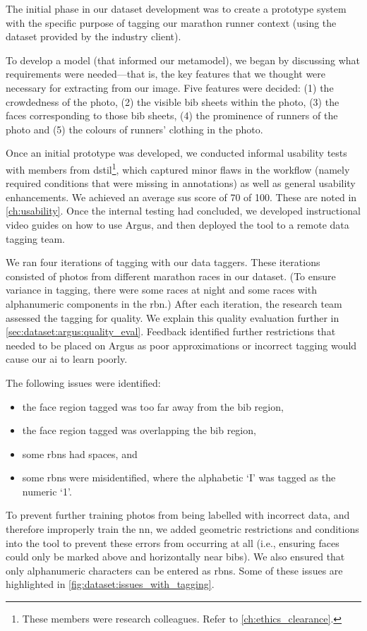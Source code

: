 The initial phase in our dataset development was to create a prototype system with the specific purpose of tagging our marathon runner context (using the dataset provided by the industry client).


To develop a model (that informed our metamodel), we began by discussing what requirements were needed---that is, the key features that we thought were necessary for extracting from our image. Five features were decided: (1) the crowdedness of the photo, (2) the visible bib sheets within the photo, (3) the faces corresponding to those bib sheets, (4) the prominence of runners of the photo and (5) the colours of runners' clothing in the photo.

Once an initial prototype was developed, we conducted informal usability tests with members from \gls{dstil}\footnote{These members were research colleagues. Refer to \cref{ch:ethics_clearance}.}, which captured minor flaws in the workflow (namely required conditions that were missing in annotations) as well as general usability enhancements. We achieved an average \gls{sus} score \citep{Jordan:1996wa} of 70 of 100. These are noted in \cref{ch:usability}. Once the internal testing had concluded, we developed instructional video guides on how to use Argus, and then deployed the tool to a remote data tagging team.

We ran four iterations of tagging with our data taggers. These iterations consisted of photos from different marathon races in our dataset. (To ensure variance in tagging, there were some races at night and some races with alphanumeric components in the \gls{rbn}.) After each iteration, the research team assessed the tagging for quality. We explain this quality evaluation further in \cref{sec:dataset:argus:quality_eval}. Feedback identified further restrictions that needed to be placed on Argus as poor approximations or incorrect tagging would cause our \gls{ai} to learn poorly. 

The following issues were identified:

\begin{itemize}
  \item the face region tagged was too far away from the bib region,
  \item the face region tagged was overlapping the bib region,
  \item some \glspl{rbn} had spaces, and
  \item some \glspl{rbn} were misidentified, where the alphabetic `I' was tagged as the numeric `1'.
\end{itemize}
\noindent
To prevent further training photos from being labelled with incorrect data, and therefore improperly train the \gls{nn},  we added geometric restrictions and conditions into the tool to prevent these errors from occurring at all (i.e., ensuring faces could only be marked above and horizontally near bibs). We also ensured that only alphanumeric characters can be entered as \glspl{rbn}. Some of these issues are highlighted in \cref{fig:dataset:issues_with_tagging}.


